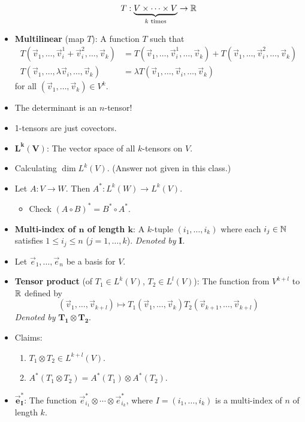 \documentclass[../notes.tex]{subfiles}
\begin{document}
\begin{itemize}
\begin{equation*}
        T:\underbrace{V\times\cdots\times V}_{k\text{ times}}\to\mathbb{R}
    \end{equation*}
    \item \textbf{Multilinear} (map $T$): A function $T$ such that
    \begin{align*}
        T(\vec{v}_1,\dots,\vec{v}_i^1+\vec{v}_i^2,\dots,\vec{v}_k) &= T(\vec{v}_1,\dots,\vec{v}_i^1,\dots,\vec{v}_k)+T(\vec{v}_1,\dots,\vec{v}_i^2,\dots,\vec{v}_k)\\
        T(\vec{v}_1,\dots,\lambda \vec{v}_i,\dots,\vec{v}_k) &= \lambda T(\vec{v}_1,\dots,\vec{v}_i,\dots,\vec{v}_k)
    \end{align*}
    for all $(\vec{v}_1,\dots,\vec{v}_k)\in V^k$.
    \item The determinant is an $n$-tensor!
    \item 1-tensors are just covectors.
    \item $\bm{L^k(V)}$: The vector space of all $k$-tensors on $V$.
    \item Calculating $\dim L^k(V)$. (Answer not given in this class.)
    \item Let $A:V\to W$. Then $A^*:L^k(W)\to L^k(V)$.
    \begin{itemize}
        \item Check $(A\circ B)^*=B^*\circ A^*$.
    \end{itemize}
    \item \textbf{Multi-index of $\bm{n}$ of length $\bm{k}$}: A $k$-tuple $(i_1,\dots,i_k)$ where each $i_j\in\mathbb{N}$ satisfies $1\leq i_j\leq n$ ($j=1,\dots,k$). \emph{Denoted by} $\bm{I}$.
    \item Let $\vec{e}_1,\dots,\vec{e}_n$ be a basis for $V$.
    \item \textbf{Tensor product} (of $T_1\in L^k(V)$, $T_2\in L^l(V)$): The function from $V^{k+l}$ to $\mathbb{R}$ defined by
    \begin{equation*}
        (\vec{v}_1,\dots,\vec{v}_{k+l}) \mapsto T_1(\vec{v}_1,\dots,\vec{v}_k)T_2(\vec{v}_{k+1},\dots,\vec{v}_{k+l})
    \end{equation*}
    \emph{Denoted by} $\bm{T_1\otimes T_2}$.
    \item Claims:
    \begin{enumerate}
        \item $T_1\otimes T_2\in L^{k+l}(V)$.
        \item $A^*(T_1\otimes T_2)=A^*(T_1)\otimes A^*(T_2)$.
    \end{enumerate}
    \item $\bm{\vec{e}_I^*}$: The function $\vec{e}_{i_1}^*\otimes\cdots\otimes\vec{e}_{i_k}^*$, where $I=(i_1,\dots,i_k)$ is a multi-index of $n$ of length $k$.

\end{itemize}
\end{document}
